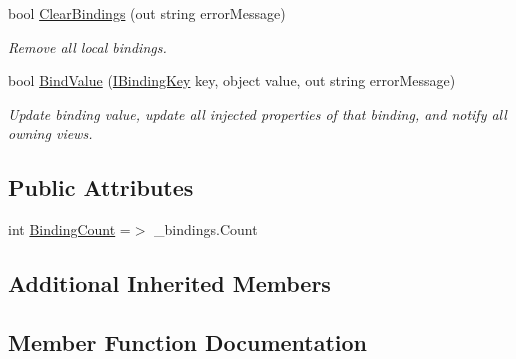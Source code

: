 \begin{DoxyCompactItemize}
bool \mbox{\hyperlink{classcp_games_1_1core_1_1_rapid_m_v_c_1_1impl_1_1_binding_collection_a131a853ccd88179353f3a875cccc7637}{Clear\+Bindings}} (out string error\+Message)
\begin{DoxyCompactList}\small\item\em Remove all local bindings. \end{DoxyCompactList}\item 
bool \mbox{\hyperlink{classcp_games_1_1core_1_1_rapid_m_v_c_1_1impl_1_1_binding_collection_ad0ee480ebb515c5b6d87336f953cd845}{Bind\+Value}} (\mbox{\hyperlink{interfacecp_games_1_1core_1_1_rapid_m_v_c_1_1_i_binding_key}{I\+Binding\+Key}} key, object value, out string error\+Message)
\begin{DoxyCompactList}\small\item\em Update binding value, update all injected properties of that binding, and notify all owning views. \end{DoxyCompactList}\end{DoxyCompactItemize}
\subsection*{Public Attributes}
\begin{DoxyCompactItemize}
\item 
int \mbox{\hyperlink{classcp_games_1_1core_1_1_rapid_m_v_c_1_1impl_1_1_binding_collection_a2566408fe6b484b97b1fad9558efd8bd}{Binding\+Count}} =$>$ \+\_\+bindings.\+Count
\end{DoxyCompactItemize}
\subsection*{Additional Inherited Members}


\subsection{Member Function Documentation}
\mbox{\label{classcp_games_1_1core_1_1_rapid_m_v_c_1_1impl_1_1_binding_collection_aac34e91512dc87adf4cfd7196093dd5b}} 
